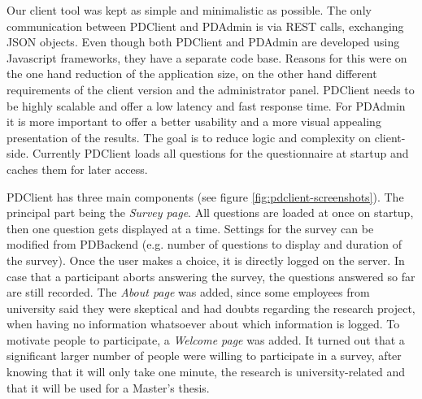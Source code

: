 		Our client tool was kept as simple and minimalistic as possible. The only communication between PDClient and PDAdmin is via REST calls, exchanging JSON objects. Even though both PDClient and PDAdmin are developed using Javascript frameworks, they have a separate code base. Reasons for this were on the one hand reduction of the application size, on the other hand different requirements of the client version and the administrator panel. PDClient needs to be highly scalable and offer a low latency and fast response time. For PDAdmin it is more important to offer a better usability and a more visual appealing presentation of the results. The goal is to reduce logic and complexity on client-side. Currently PDClient loads all questions for the questionnaire at startup and caches them for later access. 

		PDClient has three main components (see figure \ref{fig:pdclient-screenshots}). The principal part being the \textit{Survey page}. All questions are loaded at once on startup, then one question gets displayed at a time. Settings for the survey can be modified from PDBackend (e.g. number of questions to display and duration of the survey). Once the user makes a choice, it is directly logged on the server. In case that a participant aborts answering the survey, the questions answered so far are still recorded. The \textit{About page} was added, since some employees from university said they were skeptical and had doubts regarding the research project, when having no information whatsoever about which information is logged. To motivate people to participate, a \textit{Welcome page} was added. It turned out that a significant larger number of people were willing to participate in a survey, after knowing that it will only take one minute, the research is university-related and that it will be used for a Master's thesis.


